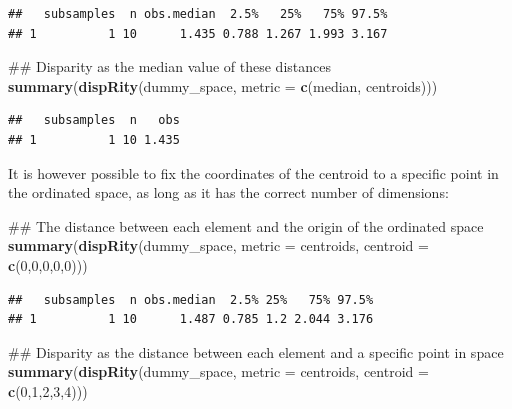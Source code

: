 \documentclass[]{book}
\newenvironment{Shaded}{\begin{snugshade}}{\end{snugshade}}
\newcommand{\KeywordTok}[1]{\textcolor[rgb]{0.13,0.29,0.53}{\textbf{#1}}}
\newcommand{\DataTypeTok}[1]{\textcolor[rgb]{0.13,0.29,0.53}{#1}}
\newcommand{\DecValTok}[1]{\textcolor[rgb]{0.00,0.00,0.81}{#1}}
\newcommand{\NormalTok}[1]{#1}
\theoremstyle{definition}
\theoremstyle{definition}
\theoremstyle{remark}
\begin{document}
\begin{verbatim}
##   subsamples  n obs.median  2.5%   25%   75% 97.5%
## 1          1 10      1.435 0.788 1.267 1.993 3.167
\end{verbatim}

\begin{Shaded}
\begin{Highlighting}[]
\NormalTok{## Disparity as the median value of these distances}
\KeywordTok{summary}\NormalTok{(}\KeywordTok{dispRity}\NormalTok{(dummy_space, }\DataTypeTok{metric =} \KeywordTok{c}\NormalTok{(median, centroids)))}
\end{Highlighting}
\end{Shaded}

\begin{verbatim}
##   subsamples  n   obs
## 1          1 10 1.435
\end{verbatim}

It is however possible to fix the coordinates of the centroid to a
specific point in the ordinated space, as long as it has the correct
number of dimensions:

\begin{Shaded}
\begin{Highlighting}[]
\NormalTok{## The distance between each element and the origin of the ordinated space}
\KeywordTok{summary}\NormalTok{(}\KeywordTok{dispRity}\NormalTok{(dummy_space, }\DataTypeTok{metric =}\NormalTok{ centroids, }\DataTypeTok{centroid =} \KeywordTok{c}\NormalTok{(}\DecValTok{0}\NormalTok{,}\DecValTok{0}\NormalTok{,}\DecValTok{0}\NormalTok{,}\DecValTok{0}\NormalTok{,}\DecValTok{0}\NormalTok{)))}
\end{Highlighting}
\end{Shaded}

\begin{verbatim}
##   subsamples  n obs.median  2.5% 25%   75% 97.5%
## 1          1 10      1.487 0.785 1.2 2.044 3.176
\end{verbatim}

\begin{Shaded}
\begin{Highlighting}[]
\NormalTok{## Disparity as the distance between each element and a specific point in space}
\KeywordTok{summary}\NormalTok{(}\KeywordTok{dispRity}\NormalTok{(dummy_space, }\DataTypeTok{metric =}\NormalTok{ centroids, }\DataTypeTok{centroid =} \KeywordTok{c}\NormalTok{(}\DecValTok{0}\NormalTok{,}\DecValTok{1}\NormalTok{,}\DecValTok{2}\NormalTok{,}\DecValTok{3}\NormalTok{,}\DecValTok{4}\NormalTok{)))}
\end{Highlighting}
\end{Shaded}
\end{document}
